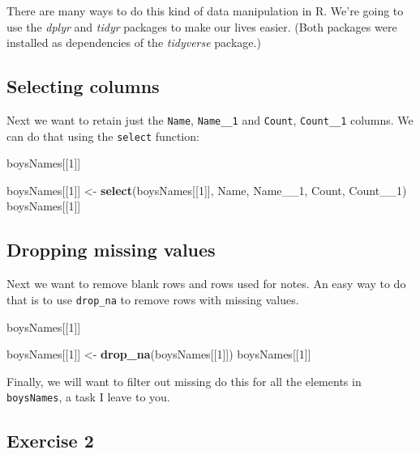 \documentclass[]{book}
\newenvironment{Shaded}{\begin{snugshade}}{\end{snugshade}}
\newcommand{\KeywordTok}[1]{\textcolor[rgb]{0.13,0.29,0.53}{\textbf{#1}}}
\newcommand{\DecValTok}[1]{\textcolor[rgb]{0.00,0.00,0.81}{#1}}
\newcommand{\StringTok}[1]{\textcolor[rgb]{0.31,0.60,0.02}{#1}}
\newcommand{\NormalTok}[1]{#1}
\begin{document}
There are many ways to do this kind of data manipulation in R. We're
going to use the \emph{dplyr} and \emph{tidyr} packages to make our
lives easier. (Both packages were installed as dependencies of the
\emph{tidyverse} package.)

\subsection{Selecting columns}\label{selecting-columns}

Next we want to retain just the \texttt{Name}, \texttt{Name\_\_1} and
\texttt{Count}, \texttt{Count\_\_1} columns. We can do that using the
\texttt{select} function:

\begin{Shaded}
\begin{Highlighting}[]
\NormalTok{boysNames[[}\DecValTok{1}\NormalTok{]]}

\NormalTok{boysNames[[}\DecValTok{1}\NormalTok{]] <-}\StringTok{ }\KeywordTok{select}\NormalTok{(boysNames[[}\DecValTok{1}\NormalTok{]], Name, Name__}\DecValTok{1}\NormalTok{, Count, Count__}\DecValTok{1}\NormalTok{)}
\NormalTok{boysNames[[}\DecValTok{1}\NormalTok{]]}
\end{Highlighting}
\end{Shaded}

\subsection{Dropping missing values}\label{dropping-missing-values}

Next we want to remove blank rows and rows used for notes. An easy way
to do that is to use \texttt{drop\_na} to remove rows with missing
values.

\begin{Shaded}
\begin{Highlighting}[]
\NormalTok{boysNames[[}\DecValTok{1}\NormalTok{]]}

\NormalTok{boysNames[[}\DecValTok{1}\NormalTok{]] <-}\StringTok{ }\KeywordTok{drop_na}\NormalTok{(boysNames[[}\DecValTok{1}\NormalTok{]])}
\NormalTok{boysNames[[}\DecValTok{1}\NormalTok{]]}
\end{Highlighting}
\end{Shaded}

Finally, we will want to filter out missing do this for all the elements
in \texttt{boysNames}, a task I leave to you.

\subsection{Exercise 2}\label{exercise-2}
\end{document}
